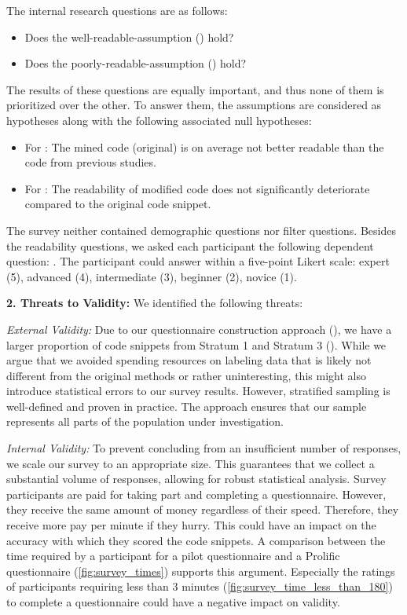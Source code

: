 \documentclass[%
class=scrreprt,
chapterprefix=false,%
open=right,%
twoside=true,%
paper=a4,%
logofile={Logo\_zentral\_farbig\_EN.png},%
thesistype=master,%
UKenglish,%
]{se2thesis}
\theoremstyle{definition}
\begin{document}
	The internal research questions are as follows:
	\begin{itemize}
		\item Does the well-readable-assumption () hold?
		\item Does the poorly-readable-assumption () hold?
	\end{itemize}
	
	The results of these questions are equally important, and thus none of them is prioritized over the other.
	To answer them, the assumptions	are considered as hypotheses along with the following associated null hypotheses:
	\begin{itemize}
		\item For : The mined code (original) is on average not better readable than the code from previous studies.
		\item For : The readability of modified code does not significantly deteriorate compared to the original code snippet.
	\end{itemize}
	
	The survey neither contained demographic questions nor filter questions. Besides the readability questions, we asked each participant the following dependent question: . The participant could answer within a five-point Likert scale: expert (5), advanced (4), intermediate (3), beginner (2), novice (1).
	
\textbf{2. Threats to Validity:}
	We identified the following threats:
	
	\textit{External Validity:}
	Due to our questionnaire construction approach (), we have a larger proportion of code snippets from Stratum 1 and Stratum 3 (). While we argue that we avoided spending resources on labeling data that is likely not different from the original methods or rather uninteresting, this might also introduce statistical errors to our survey results.
	However, stratified sampling is well-defined and proven in practice. The approach ensures that our sample represents all parts of the population under investigation.
	
	\textit{Internal Validity:}	
	To prevent concluding from an insufficient number of responses, we scale our survey to an appropriate size. This guarantees that we collect a substantial volume of responses, allowing for robust statistical analysis.
	Survey participants are paid for taking part and completing a questionnaire. However, they receive the same amount of money regardless of their speed. Therefore, they receive more pay per minute if they hurry. This could have an impact on the accuracy with which they scored the code snippets. A comparison between the time required by a participant for a pilot questionnaire and a Prolific questionnaire (\autoref{fig:survey_times}) supports this argument. Especially the ratings of participants requiring less than 3 minutes (\autoref{fig:survey_time_less_than_180}) to complete a questionnaire could have a negative impact on validity. 
	
\end{document}

